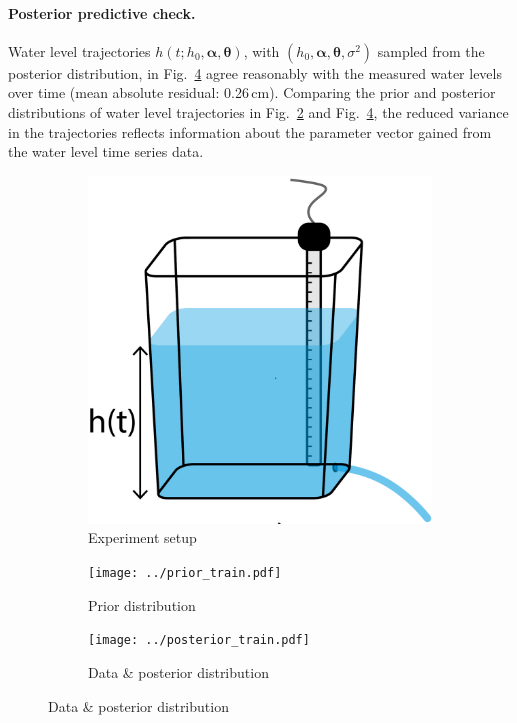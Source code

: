 \documentclass[openacc]{rsproca_new}%
\newcommand\themodel {$h(t; h_0, \boldsymbol \alpha, \boldsymbol\theta)$\xspace}
\newcommand\thevars{h_0, \boldsymbol \alpha, \boldsymbol \theta, \sigma^2}
\begin{document}
\paragraph{Posterior predictive check.} 
Water level trajectories \themodel, with $(\thevars)$ sampled from the posterior distribution, in Fig.~\ref{fig:posterior_train} agree reasonably with the measured water levels over time (mean absolute residual: 0.26\,cm). 
Comparing the prior and posterior distributions of water level trajectories in Fig.~\ref{fig:prior_train} and Fig.~\ref{fig:posterior_train}, the reduced variance in the trajectories reflects information about the parameter vector gained from the water level time series data.

\begin{figure}[!ht]
    \centering
        \begin{subfigure}[b]{0.225\textwidth}
    	\includegraphics[width=\textwidth]{../tank_geometry/naked_tank.pdf}
	\caption{Experiment setup} \label{fig:naked_tank}
    \end{subfigure}
    
     \begin{subfigure}[b]{0.4\textwidth}
    	\texttt{[image: ../prior\_train.pdf]}
	\caption{Prior distribution} \label{fig:prior_train}
    \end{subfigure}
     \begin{subfigure}[b]{0.4\textwidth}
    	\texttt{[image: ../posterior\_train.pdf]}
	\caption{Data \& posterior distribution} \label{fig:posterior_train}
    \end{subfigure}
    

\end{figure}
\end{document}
